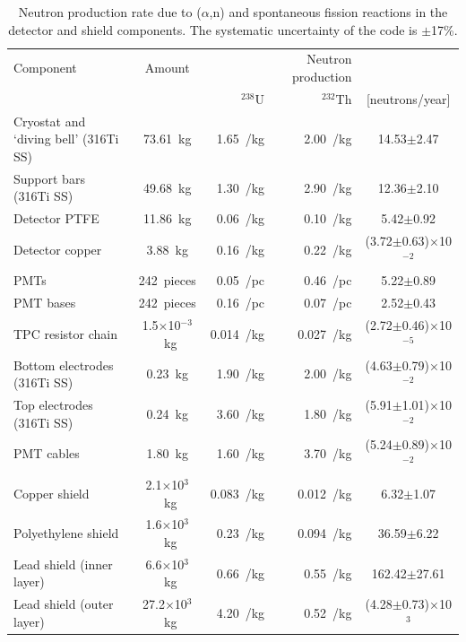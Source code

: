 \begin{table}[!ht]
\centering
\caption[Neutron production rate due to ($\alpha$,n) and spontaneous fission reactions in the detector and shield components]{Neutron production rate due to ($\alpha$,n) and spontaneous fission reactions in the detector and shield components. The systematic uncertainty of the code is $\pm$17\%.}
\label{tabTotalNeutronProductionComponents}
\begin{tabular}{>{\footnotesize}l|>{\footnotesize}c|>{\footnotesize}r|>{\footnotesize}r|>{\footnotesize}c}
\hline
Component  & Amount  & \multicolumn{2}{>{\footnotesize}c|}{Contamination [mBq]} & Neutron production \\
  		    & 		      & $^{238}$U & $^{232}$Th &  [neutrons/year] \\
\hline
Cryostat and `diving bell' (316Ti SS) 	& 73.61~kg 				& 1.65~/kg 		& 2.00~/kg 		& 14.53$\pm$2.47 \\
Support bars (316Ti SS)			& 49.68~kg 				& 1.30~/kg 		& 2.90~/kg 		& 12.36$\pm$2.10 \\
Detector PTFE 					& 11.86~kg 				& 0.06~/kg 		& 0.10~/kg 		& 5.42$\pm$0.92 \\
Detector copper 				& 3.88~kg 				& 0.16~/kg 		& 0.22~/kg 		& (3.72$\pm$0.63)$\times$10$^{-2}$ \\
PMTs 						& 242~pieces 				& 0.05~/pc		& 0.46~/pc		& 5.22$\pm$0.89 \\
PMT bases	 				& 242~pieces 				& 0.16~/pc		& 0.07~/pc		& 2.52$\pm$0.43 \\
TPC resistor chain 				& 1.5$\times$10$^{-3}$~kg 	& 0.014~/kg 		& 0.027~/kg 		& (2.72$\pm$0.46)$\times$10$^{-5}$ \\
Bottom electrodes (316Ti SS) 		& 0.23~kg 				& 1.90~/kg 		& 2.00~/kg 		& (4.63$\pm$0.79)$\times$10$^{-2}$ \\
Top electrodes (316Ti SS) 		& 0.24~kg 				& 3.60~/kg 		& 1.80~/kg 		& (5.91$\pm$1.01)$\times$10$^{-2}$ \\
PMT cables 					& 1.80~kg 				& 1.60~/kg 		& 3.70~/kg 		& (5.24$\pm$0.89)$\times$10$^{-2}$ \\
Copper shield					& 2.1$\times$10$^{3}$~kg 	& 0.083~/kg 		& 0.012~/kg 		& 6.32$\pm$1.07 \\
Polyethylene shield				& 1.6$\times$10$^{3}$~kg 	& 0.23~/kg 		& 0.094~/kg 		& 36.59$\pm$6.22 \\
Lead shield (inner layer)			& 6.6$\times$10$^{3}$~kg 	& 0.66~/kg 		& 0.55~/kg 		& 162.42$\pm$27.61 \\
Lead shield (outer layer)			& 27.2$\times$10$^{3}$~kg 	& 4.20~/kg 		& 0.52~/kg 		& (4.28$\pm$0.73)$\times$10$^{3}$ \\
\hline
\end{tabular}
\end{table}


